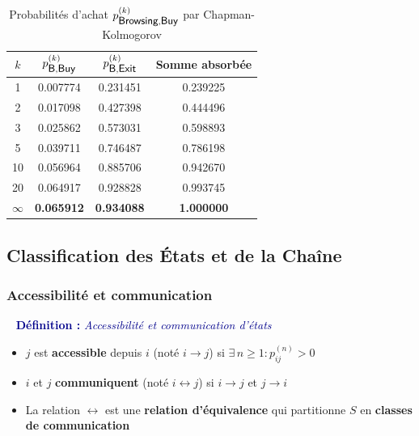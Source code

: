 \documentclass[11pt,a4paper]{article}
\newenvironment{defbox}[1]{%
  \vspace{3pt}\begin{framed}
  \noindent{\color{NavyBlue}\rule{0.3cm}{3pt}}~%
  \textcolor{DarkBlue}{\textbf{Définition :} \textit{#1}}\\[3pt]}
  {\end{framed}\vspace{3pt}}
\newcommand{\st}[1]{\textsf{\small#1}}
\begin{document}
\begin{table}[H]
\centering
\caption{Probabilités d'achat $p^{(k)}_{\st{Browsing},\st{Buy}}$ par Chapman-Kolmogorov}
\label{tab:CK}
\begin{tabular}{c|cc|c}
\toprule
\rowcolor{DarkBlue}
\color{white}$k$ &
\color{white}$p^{(k)}_{\st{B},\st{Buy}}$ &
\color{white}$p^{(k)}_{\st{B},\st{Exit}}$ &
\color{white}Somme absorbée \\
\midrule
1 & 0.007774 & 0.231451 & 0.239225 \\
\rowcolor{LightGray}
2 & 0.017098 & 0.427398 & 0.444496 \\
3 & 0.025862 & 0.573031 & 0.598893 \\
\rowcolor{LightGray}
5 & 0.039711 & 0.746487 & 0.786198 \\
10 & 0.056964 & 0.885706 & 0.942670 \\
\rowcolor{LightGray}
20 & 0.064917 & 0.928828 & 0.993745 \\
$\infty$ & \textbf{0.065912} & \textbf{0.934088} & \textbf{1.000000} \\
\bottomrule
\end{tabular}
\end{table}

\subsection{Classification des États et de la Chaîne}

\subsubsection{Accessibilité et communication}

\begin{defbox}{Accessibilité et communication d'états}
\begin{itemize}[itemsep=2pt,topsep=2pt]
  \item $j$ est \textbf{accessible} depuis $i$ (noté $i \to j$) si
        $\exists\,n\geq 1 : p_{ij}^{(n)} > 0$
  \item $i$ et $j$ \textbf{communiquent} (noté $i \leftrightarrow j$)
        si $i\to j$ et $j\to i$
  \item La relation $\leftrightarrow$ est une \textbf{relation d'équivalence}
        qui partitionne $S$ en \textbf{classes de communication}
\end{itemize}
\end{defbox}
\end{document}

